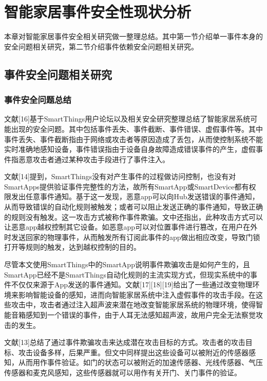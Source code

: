 \chapter{智能家居事件安全性现状分析}

本章对智能家居事件安全相关研究做一整理总结。其中第一节介绍单一事件本身的安全问题相关研究，第二节介绍事件依赖安全问题相关研究。

\section{事件安全问题相关研究}

\subsection{事件安全问题总结}

文献[16]基于SmartThings用户论坛以及相关安全研究整理总结了智能家居系统可能出现的安全问题。其中包括事件丢失、事件截断、事件错误、虚假事件等。其中事件丢失、事件截断指由于网络或攻击者等原因造成了丢包，从而使控制系统不能实时准确地感知设备，事件错误指由于设备自身故障造成错误事件的产生，虚假事件指恶意攻击者通过某种攻击手段进行了事件注入。

文献[14]提到，SmartThings没有对产生事件的过程做访问控制，也没有对SmartApps提供验证事件完整性的方法，故所有SmartApp或SmartDevice都有权限发出任意事件通知。基于这一发现，恶意app可以向Hub发送错误的事件通知，从而导致错误的自动化规则被触发；或者可以阻止发送正确的事件通知，导致正确的规则没有触发。这一攻击方式被称作事件欺骗。文中还指出，此种攻击方式可以让恶意app越权控制其它设备。如恶意app可以对位置事件进行篡改，在用户在外时发送回家的物理事件，从而触发所有订阅此事件的app做出相应改变，导致门锁打开等规则的触发，达到越权控制的目的。

尽管本文使用SmartThings中的SmartApp说明事件欺骗攻击是如何产生的，且SmartApp已经不是SmartThings自动化规则的主流实现方式，但现实系统中的事件不仅仅来源于App发送的事件通知。文献[17][18][19]给出了一些通过改变物理环境来影响智能设备的感知，进而向智能家居系统中注入虚假事件的攻击手段。在这些攻击中，攻击者通过注入超声波来潜在地改变智能家居系统的物理环境，使得智能音箱感知到一个错误的事件，由于人耳无法感知超声波，故用户完全无法察觉攻击的发生。

文献[13]总结了通过事件欺骗攻击来达成潜在攻击目标的方式。攻击者的攻击目标、攻击设备多样，后果严重。但文中同样提出这些设备可以被附近的传感器感知，从而用作事件验证。如门的状态可以被附近的加速传感器、光线传感器、气压传感器和麦克风感知，这些传感器就可以用作有关开门、关门事件的验证。

